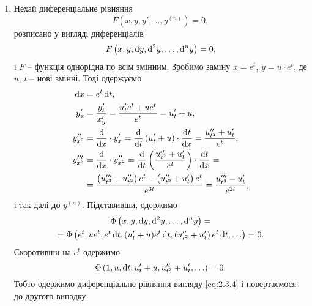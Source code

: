 \begin{enumerate}
\item Нехай диференціальне рівняння
\begin{equation}
	\label{eq:2.3.18}
	F \left( x, y, y', \ldots, y^{(n)} \right) = 0,
\end{equation}
розписано у вигляді диференціалів
\begin{equation}
	\label{eq:2.3.19}
	F \left( x, y, \mathop{}\!\mathrm{d} y, \mathop{}\!\mathrm{d}^2 y , \ldots, \mathop{}\!\mathrm{d}^n y \right) = 0,
\end{equation}
і $F$ -- функція однорідна по всім змінним. Зробимо заміну $x = e^t$, $y = u \cdot e^t$, де $u$, $t$ -- нові змінні. Тоді одержуємо
\begin{align}
	\label{eq:2.3.20}
	\diff x &= e^t \diff t, \\
	\label{eq:2.3.21}
	y_x^\prime &=  \frac{y_t^\prime}{x_y^\prime} = \frac{u_t^\prime e^t + u e^t}{e^t} = u_t^\prime + u, \\
	\label{eq:2.3.22}
	y_{x^2}^{\prime\prime} &= \frac{\diff}{\diff x} \cdot y_x^\prime = \frac{\diff}{\diff t} \left( u_t^\prime + u \right) \cdot \frac{\diff t}{\diff x} = \frac{u_{t^2}^{\prime\prime} + u_t^\prime}{e^t}, \\
	\label{eq:2.3.23}
	y_{x^3}^{\prime\prime\prime} &= \frac{\diff}{\diff x} \cdot y_{x^2}^{\prime\prime} = \frac{\diff}{\diff t} \left( \frac{u_{t^2}^{\prime\prime} + u_t^\prime }{e^t} \right) \cdot \frac{\diff t}{\diff x} = \\
	&= \frac{\left( u_{t^3}^{\prime\prime\prime} + u_{t^2}^{\prime\prime} \right) e^t - \left( u_{t^2}^{\prime\prime} + u_t^\prime \right) e^t}{e^{3t}} = \frac{u_{t^3}^{\prime\prime\prime} - u_t^\prime}{e^{2t}}, \nonumber
\end{align}
і так далі до $y^{(n)}$. Підставивши, одержимо
\begin{multline}
	\label{eq:2.3.24}
	\Phi \left(x, y, \mathop{}\!\mathrm{d} y, \mathop{}\!\mathrm{d}^2 y, \ldots, \mathop{}\!\mathrm{d}^n y\right) = \\
	= \Phi\left( e^t, u e^t, e^t \mathop{}\!\mathrm{d} t, (u_t^\prime + u)e^t \mathop{}\!\mathrm{d} t, \left(u_{t^2}^{\prime\prime} + u_t^\prime\right) e^t \mathop{}\!\mathrm{d} t, \ldots\right) = 0.
\end{multline} 
Скоротивши на $e^t$ одержимо
\begin{equation}
	\label{eq:2.3.25}
	\Phi\left( 1, u, \mathop{}\!\mathrm{d} t, u_t^\prime + u, u_{t^2}^{\prime\prime} + u_t^\prime, \ldots\right) = 0.
\end{equation} 
Тобто одержимо диференціальне рівняння вигляду \eqref{eq:2.3.4} і повертаємося до другого випадку.
\end{enumerate}